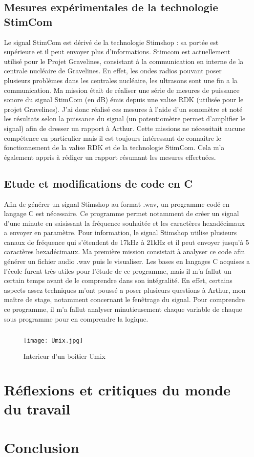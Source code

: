\documentclass[12pt]{report}
\begin{document}
	\section{Mesures expérimentales de la technologie StimCom}

Le signal StimCom est dérivé de la technologie Stimshop : sa portée est supérieure et il peut envoyer plus d'informations. Stimcom est actuellement utilisé pour le Projet Gravelines, consistant à la communication en interne de la centrale nucléaire de Gravelines. En effet, les ondes radios pouvant poser plusieurs problèmes dans les centrales nucléaire, les ultrasons sont une fin a la communication. 
Ma mission était de réaliser une série de mesures de puissance sonore du signal StimCom (en dB) émis depuis une valise RDK (utilisée pour le projet Gravelines). J'ai donc réalisé ces mesures à l'aide d'un sonomètre et noté les résultats selon la puissance du signal (un potentiomètre permet d'amplifier le signal) afin de dresser un rapport à Arthur. 
Cette missions ne nécessitait aucune compétence en particulier mais il est toujours intéressant de connaitre le fonctionnement de la valise RDK et de la technologie StimCom. Cela m'a également appris à rédiger un rapport résumant les mesures effectuées. 

	\section{Etude et modifications de code en C} 

Afin de générer un signal Stimshop au format .wav, un programme codé en langage C est nécessaire. Ce programme permet notamment de créer un signal d'une minute en saisissant la fréquence souhaitée et les caractères hexadécimaux a envoyer en paramètre. Pour information, le signal Stimshop utilise plusieurs canaux de fréquence qui s'étendent de 17kHz à 21kHz et il peut envoyer jusqu'à 5 caractères hexadécimaux.  
Ma première mission consistait à analyser ce code afin générer un fichier audio .wav puis le visualiser. Les bases en langages C acquises a l'école furent très utiles pour l'étude de ce programme, mais il m'a fallut un certain temps avant de le comprendre dans son intégralité. En effet, certains aspects assez techniques m'ont poussé a poser plusieurs questions à Arthur, mon maître de stage, notamment concernant le fenêtrage du signal. Pour comprendre ce programme, il m'a fallut analyser minutieusement chaque variable de chaque sous programme pour en comprendre la logique. 

\paragraph{}



\begin{figure}[h!]
\begin{center}
\texttt{[image: Umix.jpg]}
\end{center}
\caption{Interieur d'un boitier Umix}
\label{Interieur d'un boitier Umix}
\end{figure}


\chapter{Réflexions et critiques du monde du travail}
\chapter*{Conclusion}
\end{document}
